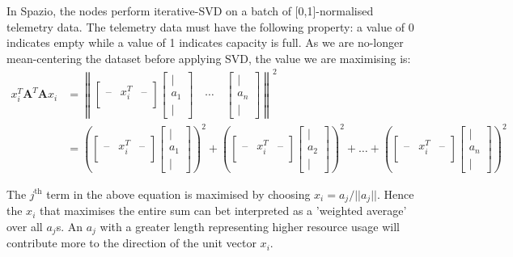 In Spazio, the nodes perform iterative-SVD on a batch of [0,1]-normalised
telemetry data. The telemetry data must have the following property: a value of
0 indicates empty while a value of 1 indicates capacity is full. As we are
no-longer mean-centering the dataset before applying SVD, the value we are
maximising is:
\begin{align}
x_i^T \mathbf{A}^T \mathbf{A} x_i &= \left\| \begin{bmatrix}
\text{--} & x_i^T & \text{--} \\
\end{bmatrix}
\begin{bmatrix}
| \\
a_1 \\
|
\end{bmatrix} \quad \cdots \quad
\begin{bmatrix}
| \\
a_n \\
|
\end{bmatrix} \right\|^2 \\
&= \left( \begin{bmatrix}
\text{--} & x_i^T & \text{--} \\
\end{bmatrix}
\begin{bmatrix}
| \\
a_1 \\
|
\end{bmatrix} \right)^2 + \left( \begin{bmatrix}
\text{--} & x_i^T & \text{--} \\
\end{bmatrix}
\begin{bmatrix}
| \\
a_2 \\
|
\end{bmatrix} \right)^2 + \dots + \left( \begin{bmatrix}
\text{--} & x_i^T & \text{--} \\
\end{bmatrix}
\begin{bmatrix}
| \\
a_n \\
|
\end{bmatrix} \right)^2
\end{align}

The $j^{\text{th}}$ term in the above equation is maximised by choosing $x_i =
a_j / ||a_j||$. Hence the $x_i$ that maximises the entire sum can bet
interpreted as a 'weighted average' over all $a_j$s. An $a_j$ with a greater
length representing higher resource usage will contribute more to the direction
of the unit vector $x_i$.

